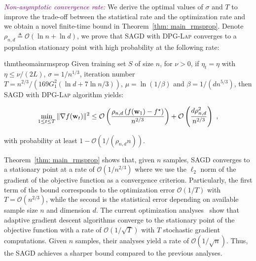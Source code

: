 \documentclass[11pt]{article}
\begin{document}
\textcolor{purple}{\textit{Non-asymptotic convergence rate:}}
We derive the optimal values of $\sigma$ and $T$ to improve the trade-off between the statistical rate and the optimization rate and we obtain a novel finite-time bound in Theorem~\ref{thm: main_rmsprop}. 
Denote $\rho_{n,d} \triangleq\mathcal{O} \left(\ln n + \ln d\right)$, we prove that \textsc{SAGD} with \textsc{DPG-Lap} converges to a population stationary point with high probability at the following rate:

\begin{restatable}{thm}{theomainrmsprop}
\label{thm: main_rmsprop}
 Given training set $S$ of size $n$, for $\nu >0$, if $\eta_t = \eta$  with $\eta \leq \nu/(2L)$,  $\sigma = 1/n^{1/3}$, iteration number $T = n^{2/3}/\left(169G_1^2(\ln d +7\ln n/3)\right)$, $\mu = \ln (1/\beta)$ and $\beta = 1/(d n^{5/3})$, then \textsc{SAGD} with \textsc{DPG-Lap} algorithm yields:
 \begin{small}
\begin{equation*}
 \min_{1\leq t \leq T}\|\nabla f(\mathbf{w}_t)\|^2 \leq
\mathcal{O} \left( \frac{\rho_{n,d} \left(f(\mathbf{w}_1) - f^\star \right)}{n^{2/3}} \right) + \mathcal{O} \left( \frac{d \rho_{n,d}^2}{n^{2/3}}\right)~,
\end{equation*}
\end{small}
with probability at least $1-\mathcal{O} \left(1/(\rho_{n,d} n)\right)$.
\end{restatable} 
Theorem~\ref{thm: main_rmsprop} shows that, given $n$ samples, \textsc{SAGD} converges to a stationary point at a rate of $\mathcal{O}(1/n^{2/3})$ where we use the $\ell_2$ norm of the gradient of the objective function as a convergence criterion.
Particularly, the first term of the bound corresponds to the optimization error $\mathcal{O}(1/T)$ with $T = \mathcal{O}(n^{2/3})$, while the second is the statistical error depending on available sample size $n$ and dimension $d$. 
The current optimization analyses~\citep{Proc:Zaheer_NeurIPS18, Proc:Ward_ICML19, Proc:Zou_CVPR19, Proc:Chen_ICLR19} show that adaptive gradient descent algorithms converge to the stationary point of the objective function with a rate of $\mathcal{O}(1/\sqrt{T})$ with $T$ stochastic gradient computations. 
Given $n$ samples, their analyses yield a rate of  $\mathcal{O}(1/\sqrt{n})$. 
Thus, the \textsc{SAGD} achieves a sharper bound compared to the previous analyses. 
\end{document}
